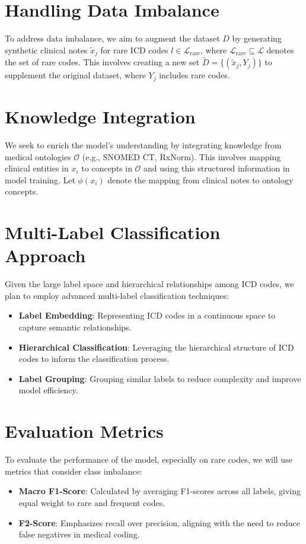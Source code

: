 \section{Handling Data Imbalance}
To address data imbalance, we aim to augment the dataset \( D \) by generating synthetic clinical notes \( \tilde{x}_j \) for rare ICD codes \( l \in \mathcal{L}_{\text{rare}} \), where \( \mathcal{L}_{\text{rare}} \subseteq \mathcal{L} \) denotes the set of rare codes. This involves creating a new set \( \tilde{D} = \{(\tilde{x}_j, Y_j)\} \) to supplement the original dataset, where \( Y_j \) includes rare codes.

\section{Knowledge Integration}
We seek to enrich the model's understanding by integrating knowledge from medical ontologies \( \mathcal{O} \) (e.g., SNOMED CT, RxNorm). This involves mapping clinical entities in \( x_i \) to concepts in \( \mathcal{O} \) and using this structured information in model training. Let \( \phi(x_i) \) denote the mapping from clinical notes to ontology concepts.

\section{Multi-Label Classification Approach}
Given the large label space and hierarchical relationships among ICD codes, we plan to employ advanced multi-label classification techniques:
\begin{itemize}
    \item \textbf{Label Embedding}: Representing ICD codes in a continuous space to capture semantic relationships.
    \item \textbf{Hierarchical Classification}: Leveraging the hierarchical structure of ICD codes to inform the classification process.
    \item \textbf{Label Grouping}: Grouping similar labels to reduce complexity and improve model efficiency.
\end{itemize}

\section{Evaluation Metrics}
To evaluate the performance of the model, especially on rare codes, we will use metrics that consider class imbalance:
\begin{itemize}
    \item \textbf{Macro F1-Score}: Calculated by averaging F1-scores across all labels, giving equal weight to rare and frequent codes.
    \item \textbf{F2-Score}: Emphasizes recall over precision, aligning with the need to reduce false negatives in medical coding.
\end{itemize}

